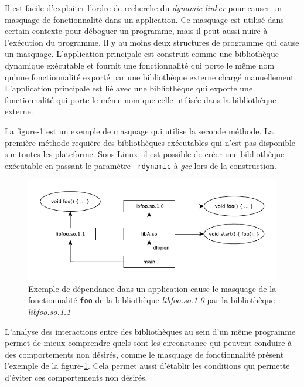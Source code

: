 
Il est facile d'exploiter l'ordre de recherche du \textit{dynamic linker} pour
causer un masquage de fonctionnalité dans un application. Ce masquage est
utilisé dans certain contexte pour déboguer un programme, mais il peut aussi
nuire à l'exécution du programme. Il y au moins deux structures de programme
qui cause un masquage. L'application principale est construit comme une
bibliothèque dynamique exécutable et fournit une fonctionnalité qui porte le
même nom qu'une fonctionnalité exporté par une bibliothèque externe chargé
manuellement.  L'application principale est lié avec une bibliothèque qui
exporte une fonctionnalité qui porte le même nom que celle utilisée dans la
bibliothèque externe.

La figure-\ref{fig:deps-ex2} est un exemple de masquage qui utilise la seconde
méthode. La première méthode requière des bibliothèques exécutables qui n'est pas
disponible sur toutes les plateforme. Sous Linux, il est possible de créer une
bibliothèque exécutable en passant le paramètre \texttt{-rdynamic} à \textit{gcc}
lors de la construction.

\begin{center}
    \begin{figure}[ht]
        \includegraphics{figures/libdeps-ex2.pdf}
        \caption{Exemple de dépendance dans un application cause le masquage de la fonctionnalité \texttt{foo}
        de la bibliothèque \textit{libfoo.so.1.0} par la bibliothèque \textit{libfoo.so.1.1}}
        \label{fig:deps-ex2}
    \end{figure}
\end{center}


L'analyse des interactions entre des bibliothèques au sein d'un même programme permet de
mieux comprendre quels sont les circonstance qui peuvent conduire à des comportements
non désirés, comme le masquage de fonctionnalité présent l'exemple de la figure-\ref{fig:deps-ex2}.
Cela permet aussi d'établir les conditions qui permette d'éviter ces comportements non désirés.

